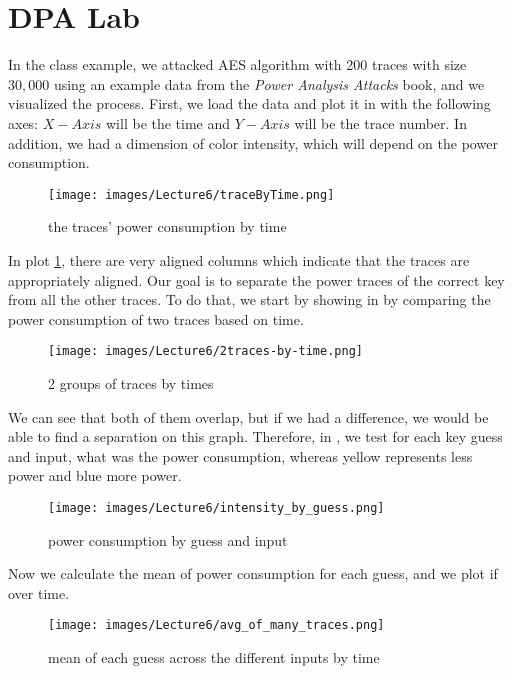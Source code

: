 \section{DPA Lab}
In the class example, we attacked AES algorithm with 200 traces with size $30,000$ using an example data from the \textit{Power Analysis Attacks} book, and we visualized the process. 
First, we load the data and plot it in  with the following axes: $X-Axis$ will be the time and $Y-Axis$ will be the trace number.
In addition, we had a dimension of color intensity, which will depend on the power consumption.

\begin{figure}[!ht]
    \centering
    \texttt{[image: images/Lecture6/traceByTime.png]}
    \caption{the traces' power consumption by time} \label{fig:traceByTime}
\end{figure}

In plot \ref{fig:traceByTime}, there are very aligned columns which indicate that the traces are appropriately aligned. 
Our goal is to separate the power traces of the correct key from all the other traces. 
To do that, we start by showing in  by comparing the power consumption of two traces based on time.

\begin{figure}[!ht]
    \centering
    \texttt{[image: images/Lecture6/2traces-by-time.png]}
    \caption{2 groups of traces by times} \label{fig:2traces-by-time}
\end{figure}

We can see that both of them overlap, but if we had a difference, we would be able to find a separation on this graph.
Therefore, in , we test for each key guess and input, what was the power consumption, whereas yellow represents less power and blue more power.

\begin{figure}[!ht]
    \centering
    \texttt{[image: images/Lecture6/intensity\_by\_guess.png]}
    \caption{power consumption by guess and input} \label{fig:intensity_by_guess}
\end{figure}

Now we calculate the mean of power consumption for each guess, and we plot if over time.

\begin{figure}[!ht]
    \centering
    \texttt{[image: images/Lecture6/avg\_of\_many\_traces.png]}
    \caption{mean of each guess across the different inputs by time} \label{fig:avg_of_many_traces}
\end{figure}


